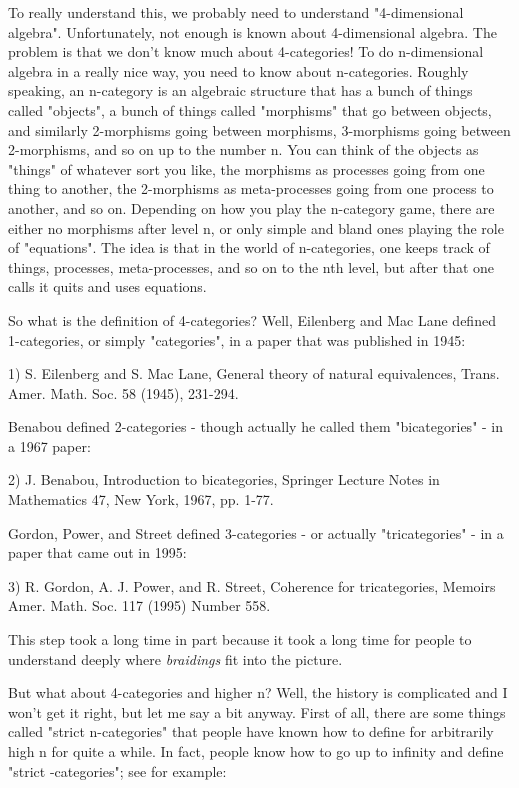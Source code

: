 To really understand this, we probably need to understand
"4-dimensional algebra".  Unfortunately, not enough is known about
4-dimensional algebra.  The problem is that we don't know much about
4-categories!  To do n-dimensional algebra in a really nice way, you
need to know about n-categories.  Roughly speaking, an n-category is
an algebraic structure that has a bunch of things called "objects", a
bunch of things called "morphisms" that go between objects, and
similarly 2-morphisms going between morphisms, 3-morphisms going
between 2-morphisms, and so on up to the number n.  You can think of
the objects as "things" of whatever sort you like, the morphisms as
processes going from one thing to another, the 2-morphisms as
meta-processes going from one process to another, and so on.
Depending on how you play the n-category game, there are either no
morphisms after level n, or only simple and bland ones playing the
role of "equations".  The idea is that in the world of n-categories,
one keeps track of things, processes, meta-processes, and so on to the
nth level, but after that one calls it quits and uses equations.  

So what is the definition of 4-categories?  Well, Eilenberg and
Mac Lane defined 1-categories, or simply "categories", in a paper
that was published in 1945:

1) S. Eilenberg and S. Mac Lane, General theory of natural
equivalences, Trans. Amer. Math. Soc. 58 (1945), 231-294.

Benabou defined 2-categories - though actually he called them 
"bicategories" - in a 1967 paper:

2) J. Benabou, Introduction to bicategories, Springer Lecture Notes in
Mathematics 47, New York, 1967, pp. 1-77.

Gordon, Power, and Street defined 3-categories - or actually 
"tricategories" - in a paper that came out in 1995:

3) R. Gordon, A. J. Power, and R. Street, Coherence for tricategories,
Memoirs Amer. Math. Soc. 117 (1995) Number 558.

This step took a long time in part because it took a long time for
people to understand deeply where \emph{braidings} fit into the picture.

But what about 4-categories and higher n?  Well, the history is
complicated and I won't get it right, but let me say a bit anyway.
First of all, there are some things called "strict n-categories" that
people have known how to define for arbitrarily high n for quite a
while.  In fact, people know how to go up to infinity and define
"strict \omega -categories"; see for example:

